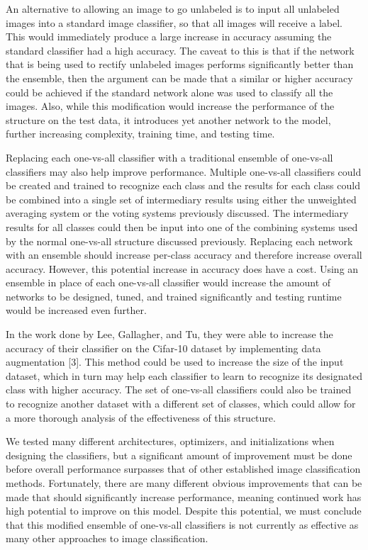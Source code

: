 \documentclass[10pt,twocolumn,letterpaper]{article}
\begin{document}
An alternative to allowing an image to go unlabeled is to input all unlabeled images into a standard image classifier, so that all images will receive a label. This would immediately produce a large increase in accuracy assuming the standard classifier had a high accuracy. The caveat to this is that if the network that is being used to rectify unlabeled images performs significantly better than the ensemble, then the argument can be made that a similar or higher accuracy could be achieved if the standard network alone was used to classify all the images. Also, while this modification would increase the performance of the structure on the test data, it introduces yet another network to the model, further increasing complexity, training time, and testing time.

Replacing each one-vs-all classifier with a traditional ensemble of one-vs-all classifiers may also help improve performance. Multiple one-vs-all classifiers could be created and trained to recognize each class and the results for each class could be combined into a single set of intermediary results using either the unweighted averaging system or the voting systems previously discussed. The intermediary results for all classes could then be input into one of the combining systems used by the normal one-vs-all structure discussed previously. Replacing each network with an ensemble should increase per-class accuracy and therefore increase overall accuracy. However, this potential increase in accuracy does have a cost. Using an ensemble in place of each one-vs-all classifier would increase the amount of networks to be designed, tuned, and trained significantly and testing runtime would be increased even further.

In the work done by Lee, Gallagher, and Tu,  they were able to increase the accuracy of their classifier on the Cifar-10 dataset by implementing data augmentation [3]. This method could be used to increase the size of the input dataset, which in turn may help each classifier to learn to recognize its designated class with higher accuracy. The set of one-vs-all classifiers could also be trained to recognize another dataset with a different set of classes, which could allow for a more thorough analysis of the effectiveness of this structure.

We tested many different architectures, optimizers, and initializations when designing the classifiers, but a significant amount of improvement must be done before overall performance surpasses that of other established image classification methods. Fortunately, there are many different obvious improvements that can be made that should significantly increase performance, meaning continued work has high potential to improve on this model. Despite this potential, we must conclude that this modified ensemble of one-vs-all classifiers is not currently as effective as many other approaches to image classification.
\end{document}
